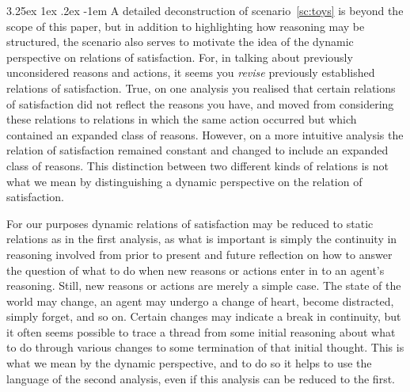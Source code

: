 \documentclass[10pt]{article}
\makeatletter
\renewcommand\paragraph{\@startsection{paragraph}{5}{\z@}%
  {3.25ex \@plus1ex \@minus.2ex}%
  {-1em}%
  {\normalfont\normalsize\bfseries}}
\makeatother
\begin{document}
\paragraph{ } %
A detailed deconstruction of scenario~\ref{sc:toys} is beyond the scope of this paper, but in addition to highlighting how reasoning may be structured, the scenario also serves to motivate the idea of the dynamic perspective on relations of satisfaction.
For, in talking about previously unconsidered reasons and actions, it seems you \emph{revise} previously established relations of satisfaction.
True, on one analysis you realised that certain relations of satisfaction did not reflect the reasons you have, and moved from considering these relations to relations in which the same action occurred but which contained an expanded class of reasons.
However, on a more intuitive analysis the relation of satisfaction remained constant and changed to include an expanded class of reasons.
This distinction between two different kinds of relations is not what we mean by distinguishing a dynamic perspective on the relation of satisfaction.

For our purposes dynamic relations of satisfaction may be reduced to static relations as in the first analysis, as what is important is simply the continuity in reasoning involved from prior to present and future reflection on how to answer the question of what to do when new reasons or actions enter in to an agent's reasoning.
Still, new reasons or actions are merely a simple case.
The state of the world may change, an agent may undergo a change of heart, become distracted, simply forget, and so on.
Certain changes may indicate a break in continuity, but it often seems possible to trace a thread from some initial reasoning about what to do through various changes to some termination of that initial thought.
This is what we mean by the dynamic perspective, and to do so it helps to use the language of the second analysis, even if this analysis can be reduced to the first.
\end{document}

